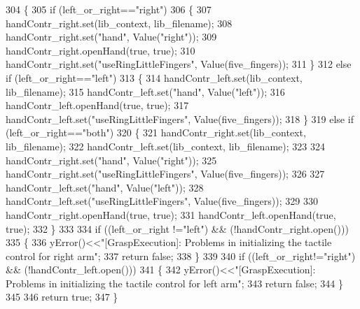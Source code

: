 \begin{DoxyCode}
304 \{
305     \textcolor{keywordflow}{if} (left\_or\_right==\textcolor{stringliteral}{"right"})
306     \{
307         handContr_right.set(lib_context, lib_filename);
308         handContr_right.set(\textcolor{stringliteral}{"hand"}, Value(\textcolor{stringliteral}{"right"}));
309         handContr_right.openHand(\textcolor{keyword}{true}, \textcolor{keyword}{true});
310         handContr_right.set(\textcolor{stringliteral}{"useRingLittleFingers"}, Value(five\_fingers));
311     \}
312     \textcolor{keywordflow}{else} \textcolor{keywordflow}{if} (left\_or\_right==\textcolor{stringliteral}{"left"})
313     \{
314         handContr\_left.set(lib_context, lib_filename);
315         handContr\_left.set(\textcolor{stringliteral}{"hand"}, Value(\textcolor{stringliteral}{"left"}));
316         handContr\_left.openHand(\textcolor{keyword}{true}, \textcolor{keyword}{true});
317         handContr\_left.set(\textcolor{stringliteral}{"useRingLittleFingers"}, Value(five\_fingers));
318     \}
319     \textcolor{keywordflow}{else} \textcolor{keywordflow}{if} (left\_or\_right==\textcolor{stringliteral}{"both"})
320     \{
321         handContr_right.set(lib_context, lib_filename);
322         handContr\_left.set(lib_context, lib_filename);
323 
324         handContr_right.set(\textcolor{stringliteral}{"hand"}, Value(\textcolor{stringliteral}{"right"}));
325         handContr_right.set(\textcolor{stringliteral}{"useRingLittleFingers"}, Value(five\_fingers));
326 
327         handContr\_left.set(\textcolor{stringliteral}{"hand"}, Value(\textcolor{stringliteral}{"left"}));
328         handContr\_left.set(\textcolor{stringliteral}{"useRingLittleFingers"}, Value(five\_fingers));
329 
330         handContr_right.openHand(\textcolor{keyword}{true}, \textcolor{keyword}{true});
331         handContr\_left.openHand(\textcolor{keyword}{true}, \textcolor{keyword}{true});
332     \}
333 
334     \textcolor{keywordflow}{if} ((left\_or\_right !=\textcolor{stringliteral}{"left"}) && (!handContr_right.open()))
335     \{
336         yError()<<\textcolor{stringliteral}{"[GraspExecution]: Problems in initializing the tactile control for right arm"};
337         \textcolor{keywordflow}{return} \textcolor{keyword}{false};
338     \}
339 
340     \textcolor{keywordflow}{if} ((left\_or\_right!=\textcolor{stringliteral}{"right"}) && (!handContr\_left.open()))
341     \{
342         yError()<<\textcolor{stringliteral}{"[GraspExecution]: Problems in initializing the tactile control for left arm"};
343         \textcolor{keywordflow}{return} \textcolor{keyword}{false};
344     \}
345 
346     \textcolor{keywordflow}{return} \textcolor{keyword}{true};
347 \}
\end{DoxyCode}
